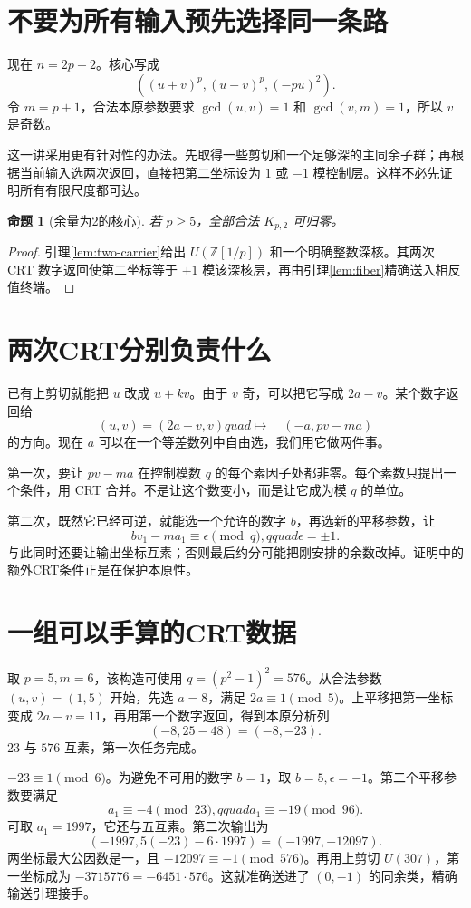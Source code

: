 \documentclass[11pt,a4paper,oneside,openany]{book}
\newcommand{\Z}{\mathbb Z}
\newtheorem{proposition}[theorem]{命题}
\theoremstyle{definition}
\numberwithin{equation}{chapter}
\begin{document}
\section{不要为所有输入预先选择同一条路}
现在 $n=2p+2$。核心写成
\[((u+v)^p,(u-v)^p,(-pu)^2).
\]
令 $m=p+1$，合法本原参数要求 $\gcd(u,v)=1$ 和 $\gcd(v,m)=1$，所以 $v$ 是奇数。

这一讲采用更有针对性的办法。先取得一些剪切和一个足够深的主同余子群；再根据当前输入选两次返回，直接把第二坐标设为 $1$ 或 $-1$ 模控制层。这样不必先证明所有有限尺度都可达。
\begin{proposition}[余量为2的核心]\label{prop:r2}
若 $p\ge5$，全部合法 $K_{p,2}$ 可归零。
\end{proposition}
\begin{proof}
引理\ref{lem:two-carrier}给出 $U(\Z[1/p])$ 和一个明确整数深核。其两次 CRT 数字返回使第二坐标等于 $\pm1$ 模该深核层，再由引理\ref{lem:fiber}精确送入相反值终端。
\end{proof}

\section{两次CRT分别负责什么}
已有上剪切就能把 $u$ 改成 $u+kv$。由于 $v$ 奇，可以把它写成 $2a-v$。某个数字返回给
\[(u,v)=(2a-v,v)quad\longmapsto\quad(-a,pv-ma)
\]
的方向。现在 $a$ 可以在一个等差数列中自由选，我们用它做两件事。

第一次，要让 $pv-ma$ 在控制模数 $q$ 的每个素因子处都非零。每个素数只提出一个条件，用 CRT 合并。不是让这个数变小，而是让它成为模 $q$ 的单位。

第二次，既然它已经可逆，就能选一个允许的数字 $b$，再选新的平移参数，让
\[bv_1-ma_1\equiv\epsilon\pmod q,qquad\epsilon=\pm1.
\]
与此同时还要让输出坐标互素；否则最后约分可能把刚安排的余数改掉。证明中的额外CRT条件正是在保护本原性。

\section{一组可以手算的CRT数据}
取 $p=5,m=6$，该构造可使用 $q=(p^2-1)^2=576$。从合法参数 $(u,v)=(1,5)$ 开始，先选 $a=8$，满足 $2a\equiv1\pmod5$。上平移把第一坐标变成 $2a-v=11$，再用第一个数字返回，得到本原分析列
\[(-8,25-48)=(-8,-23).
\]
$23$ 与 $576$ 互素，第一次任务完成。

$-23\equiv1\pmod6$。为避免不可用的数字 $b=1$，取 $b=5,\epsilon=-1$。第二个平移参数要满足
\[a_1\equiv-4\pmod{23},qquad a_1\equiv-19\pmod{96}.
\]
可取 $a_1=1997$，它还与五互素。第二次输出为
\[(-1997,5(-23)-6\cdot1997)=(-1997,-12097).
\]
两坐标最大公因数是一，且 $-12097\equiv-1\pmod{576}$。再用上剪切 $U(307)$，第一坐标成为 $-3715776=-6451\cdot576$。这就准确送进了 $(0,-1)$ 的同余类，精确输送引理接手。
\end{document}
